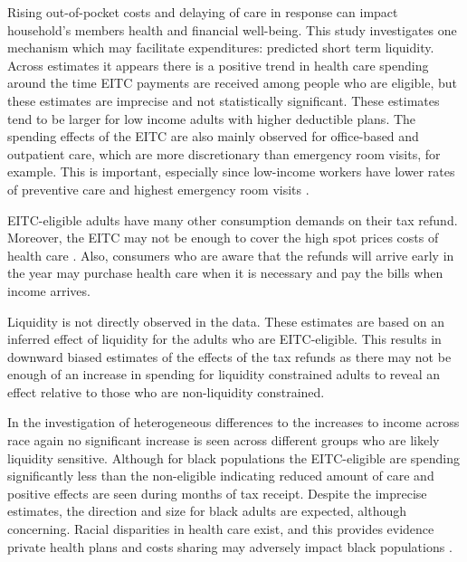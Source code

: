\documentclass[smallcondensed,referee]{svjour3}
\begin{document}
Rising out-of-pocket costs and delaying of care in response can impact household's members health and financial well-being. This study investigates one mechanism which may facilitate expenditures: predicted short term liquidity. Across estimates it appears there is a  positive trend in health care spending around the time EITC payments are received among people who are eligible, but these estimates are imprecise and not statistically significant.    These estimates tend to be larger for low income adults with higher deductible plans. The spending effects of the EITC are also mainly observed for office-based and outpatient care, which are more discretionary than emergency room visits, for example. This is important, especially since low-income workers have lower rates of preventive care and highest emergency room visits  \citep{sherman_health_2017} . 

EITC-eligible adults have many other consumption demands on their tax refund.  Moreover, the EITC may not be enough to cover the high spot prices costs of health care  \citep{claxton_employer_2018}.  Also, consumers who are aware that the refunds will arrive early in the year  may purchase health care when it is necessary and pay the bills when income arrives. 

Liquidity is not directly observed in the data. These estimates are based on an inferred effect of liquidity for the adults who are EITC-eligible. This results in downward biased estimates of the effects of the tax refunds as there may not be enough of an increase in spending for liquidity constrained adults to reveal an effect relative to those who are non-liquidity constrained.  


In the investigation of heterogeneous differences to the increases to income across race again no significant increase is seen across different groups who are likely liquidity sensitive. Although for black populations the EITC-eligible are spending significantly less than the non-eligible indicating reduced amount of care and positive effects are seen during months of tax receipt. Despite the imprecise estimates, the direction and size for black adults are expected, although concerning.  Racial disparities in health care exist, and this provides evidence private health plans and costs sharing may adversely impact black populations \citep{charron-chenier_racial_2018, dogra_consumption_2016}.  
\end{document}
